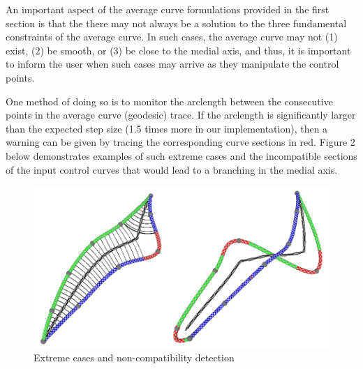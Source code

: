 \documentclass[journal, letterpaper]{IEEEtran}
\begin{document}
An important aspect of the average curve formulations provided in the first section is that the 
there may not always be a solution to the three fundamental constraints of the average curve.
In such cases, the average curve may not (1) exist, (2) be smooth, or (3) be close to the medial axis,
and thus, it is important to inform the user when such cases may arrive as they manipulate the control points.

One method of doing so is to monitor the arclength between the consecutive points in the average curve (geodesic)
trace. If the arclength is significantly larger than the expected step size (1.5 times more in our implementation), 
then a warning can be given by tracing the corresponding curve sections in red. Figure 2 below demonstrates
examples of such extreme cases and the incompatible sections of the input control curves that would lead to a branching
in the medial axis. 

\begin{figure}[ht!]
  \includegraphics[width=1.0\linewidth]{images/Result45.png}
	\caption{Extreme cases and non-compatibility detection}
	\label{fig:Result4}
\end{figure}
\end{document}
